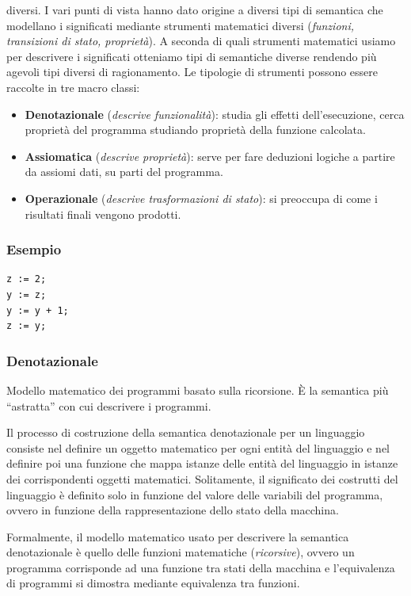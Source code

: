 \documentclass[oneside,a4paper,11pt]{book}
\theoremstyle{italicstyle}
\theoremstyle{normStyle}
\begin{document}
diversi. I vari punti di vista hanno dato origine a diversi tipi di semantica
che modellano i significati mediante strumenti matematici diversi (\textit{funzioni, 
transizioni di stato, proprietà}). A seconda di quali strumenti matematici usiamo per 
descrivere i significati otteniamo tipi di semantiche diverse rendendo più 
agevoli tipi diversi di ragionamento. Le tipologie di strumenti possono essere 
raccolte in tre macro classi: 
\begin{itemize}
  \item \textbf{Denotazionale} (\textit{descrive funzionalità}): studia gli effetti dell'esecuzione, cerca proprietà 
  del programma studiando proprietà della funzione calcolata.
  \item \textbf{Assiomatica} (\textit{descrive proprietà}): serve per fare deduzioni logiche a partire da 
  assiomi dati, su parti del programma.
  \item \textbf{Operazionale} (\textit{descrive trasformazioni di stato}): si preoccupa di come i risultati finali vengono prodotti.
\end{itemize}
\subsubsection{Esempio}
\begin{lstlisting}
z := 2;
y := z;
y := y + 1;
z := y;
\end{lstlisting}
\subsubsection{Denotazionale}
\begin{tcolorbox}[title = {Semantica denotazionale}]
Modello matematico dei programmi basato sulla ricorsione. È la semantica
più “astratta” con cui descrivere i programmi.
\end{tcolorbox}
Il processo di costruzione della semantica denotazionale
per un linguaggio consiste nel definire un oggetto matematico per ogni entità
del linguaggio e nel definire poi una funzione che mappa istanze delle entità
del linguaggio in istanze dei corrispondenti oggetti matematici. Solitamente,
il significato dei costrutti del linguaggio è definito solo in funzione del
valore delle variabili del programma, ovvero in funzione della rappresentazione
dello stato della macchina.

Formalmente, il modello matematico usato per descrivere la semantica
denotazionale è quello delle funzioni matematiche (\textit{ricorsive}),
ovvero un programma corrisponde ad una funzione tra stati della macchina
e l’equivalenza di programmi si dimostra mediante equivalenza tra funzioni.
\end{document}
